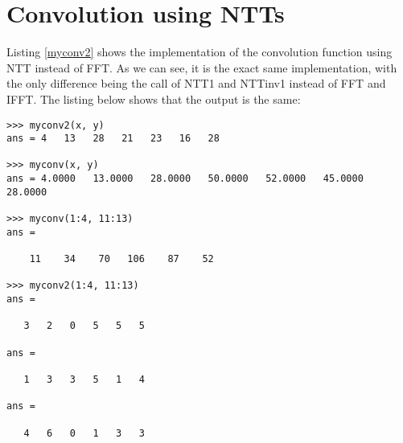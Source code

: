 \documentclass{article}
\begin{document}




\section{Convolution using NTTs}
Listing \ref{myconv2} shows the implementation of the convolution function using NTT instead of FFT. As we can see, it is the exact same implementation, with the only difference being the call of NTT1 and NTTinv1 instead of FFT and IFFT. The listing below shows that the output is the same:

\begin{lstlisting}
>>> myconv2(x, y)
ans = 4   13   28   21   23   16   28

>>> myconv(x, y)
ans = 4.0000   13.0000   28.0000   50.0000   52.0000   45.0000   28.0000

>>> myconv(1:4, 11:13)
ans =

    11    34    70   106    87    52

>>> myconv2(1:4, 11:13)
ans =

   3   2   0   5   5   5

ans =

   1   3   3   5   1   4

ans =

   4   6   0   1   3   3
\end{lstlisting}

 
\end{document}
